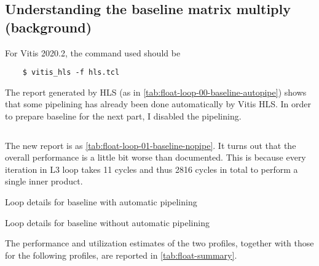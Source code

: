 \subsection{Understanding the baseline matrix multiply (background)}\label{sec:1a}

For Vitis 2020.2, the command used should be
\begin{verbatim}
    $ vitis_hls -f hls.tcl
\end{verbatim}
The report generated by HLS (as in \autoref{tab:float-loop-00-baseline-autopipe}) shows that
some pipelining has already been done automatically by Vitis HLS.
In order to prepare baseline for the next part, I disabled the pipelining.

\inputminted{diff}{program/float_nopipe.diff}

The new report is as \autoref{tab:float-loop-01-baseline-nopipe}.
It turns out that the overall performance is a little bit worse than documented.
This is because every iteration in L3 loop takes 11 cycles and thus
2816 cycles in total to perform a single inner product.

\begin{table}
    \caption{Loop details for baseline with automatic pipelining}
    \label{tab:float-loop-00-baseline-autopipe}
    \centering
    
\end{table}

\begin{table}
    \caption{Loop details for baseline without automatic pipelining}
    \label{tab:float-loop-01-baseline-nopipe}
    \centering
    
\end{table}

The performance and utilization estimates of the two profiles, together with those for the following profiles, are reported in \autoref{tab:float-summary}.
